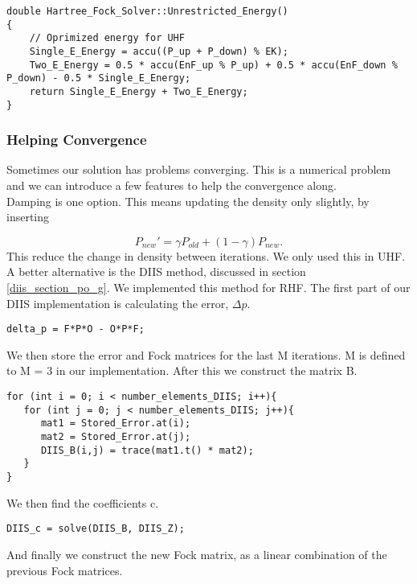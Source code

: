\begin{lstlisting}
double Hartree_Fock_Solver::Unrestricted_Energy()
{
    // Oprimized energy for UHF
    Single_E_Energy = accu((P_up + P_down) % EK);
    Two_E_Energy = 0.5 * accu(EnF_up % P_up) + 0.5 * accu(EnF_down % P_down) - 0.5 * Single_E_Energy;
    return Single_E_Energy + Two_E_Energy;
}
\end{lstlisting}


\subsubsection{Helping Convergence}
Sometimes our solution has problems converging. This is a numerical problem and we can introduce a few features to help the convergence along. \\

Damping is one option. This means updating the density only slightly, by inserting

\begin{equation}
P_{new}' = \gamma P_{old} + \left( 1 - \gamma \right) P_{new} .
\end{equation}
This reduce the change in density between iterations. We only used this in UHF. \\

A better alternative is the DIIS method, discussed in section \ref{diis_section_po_g}. We implemented this method for RHF. The first part of our DIIS implementation is calculating the error, $\Delta p$. 

\begin{lstlisting}
delta_p = F*P*O - O*P*F;
\end{lstlisting}

We then store the error and Fock matrices for the last M iterations. M is defined to M = 3 in our implementation. After this we construct the matrix B. 

\begin{lstlisting}
for (int i = 0; i < number_elements_DIIS; i++){
   for (int j = 0; j < number_elements_DIIS; j++){
      mat1 = Stored_Error.at(i);
      mat2 = Stored_Error.at(j);
      DIIS_B(i,j) = trace(mat1.t() * mat2);
   }
}
\end{lstlisting}

We then find the coefficients c.

\begin{lstlisting}
DIIS_c = solve(DIIS_B, DIIS_Z);
\end{lstlisting}

And finally we construct the new Fock matrix, as a linear combination of the previous Fock matrices. 

